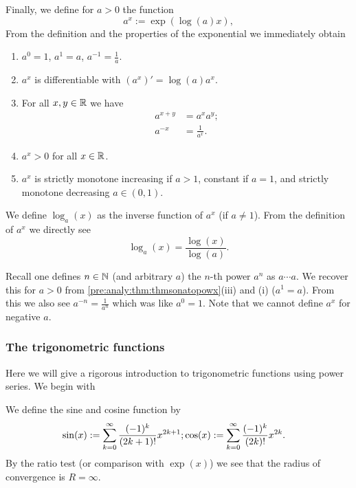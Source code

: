 \documentclass[10pt, a4paper]{article}
\newcommand{\infsumo}{\infsum[k = 0]}
\begin{document}
Finally,
we define for $a > 0$ the function
\[
a ^ x := \exp(\log(a)x),
\]
From the definition and the properties of the exponential we immediately obtain
\begin{theorem}\label{pre:analy:thm:thmsonatopowx}
    \begin{enumerate}[label = (\roman*)]
        \item $a ^ 0 = 1$,
        $a ^ 1 = a$,
        $a ^ {-1} = \frac{1}{a}$.
        
        \item $a ^ x$ is differentiable with $(a ^ x)' = \log(a)a ^ x$.

        \item For all $x, y \in \mathbb{R}$ we have
        \begin{align*}
            a ^ {x + y} &= a ^ xa ^ y; \\
            a ^ {-x} &= \frac{1}{a ^ x}.
        \end{align*}
        
        \item $a ^ x > 0$ for all $x \in \mathbb{R}$.

        \item $a ^ x$ is strictly monotone increasing if $a > 1$,
        constant if $a = 1$,
        and strictly monotone decreasing $a \in (0, 1)$.
    \end{enumerate}
\end{theorem}

We define $\log_a(x)$ as the inverse function of $a ^ x$
(if $a \neq 1$).
From the definition of $a ^ x$ we directly see
\[
\log_a(x) = \frac{\log(x)}{\log(a)}.
\]
\begin{remark}
    Recall one defines $n \in \mathbb{N}$
    (and arbitrary $a$)
    the $n$-th power $a ^ n$ as $a \dotsi a$.
    We recover this for $a > 0$ from \autoref{pre:analy:thm:thmsonatopowx}(iii) and (i)
    ($a ^ 1 = a$).
    From this we also see $a ^ {-n} = \frac{1}{a ^ n}$ which was like $a ^ 0 = 1$.
    Note that we cannot define $a ^ x$ for negative $a$.
\end{remark}

\subsubsection{The trigonometric functions}

Here we will give a rigorous introduction to trigonometric functions using power series.
We begin with
\begin{definition}
    We define the sine and cosine function by
    \begin{align*}
        \sin(x) := \infsumo\frac{(-1) ^ k}{(2k + 1)!}x ^ {2k + 1};&\cos(x) := \infsumo\frac{(-1) ^ k}{(2k)!}x ^ {2k}.
    \end{align*}
    By the ratio test
    (or comparison with $\exp(x)$)
    we see that the radius of convergence is $R = \infty$.
\end{definition}
\end{document}
